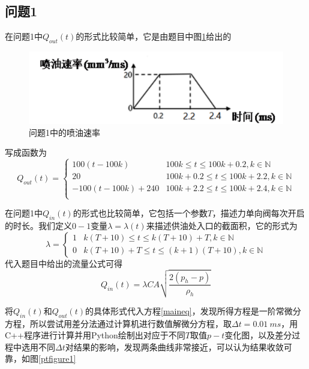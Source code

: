 \documentclass[12pt,AutoFakeBold]{article}%
\begin{document}
    \subsection{问题1}
    在问题1中$Q_{out}(t)$的形式比较简单，它是由题目中图\ref{inputof1}给出的
    \begin{figure}[H]
        \centering
        \includegraphics[scale=0.75]{figure/inputof1.png}
        \caption{问题1中的喷油速率}
        \label{inputof1}
    \end{figure}
    写成函数为
    \begin{equation}
        Q_{out}(t)=
        \begin{cases}
            100(t-100k)&100k\leq t\leq 100k+0.2,k\in\mathbb{N}\\
            20&100k+0.2\leq t\leq 100k+2.2,k\in\mathbb{N}\\
            -100(t-100k)+240&100k+2.2\leq t\leq 100k+2.4,k\in\mathbb{N}\\
        \end{cases}
    \end{equation}\par
    在问题1中$Q_{in}(t)$的形式也比较简单，它包括一个参数$T$，描述力单向阀每次开启的时长。我们定义$0-1$变量$\lambda=\lambda(t)$来描述供油处入口的截面积，它的形式为
    \begin{equation}
        \lambda=
        \begin{cases}
            1 & k(T+10)\leq t\leq k(T+10)+T,k\in\mathbb{N}\\
            0 & k(T+10)+T\leq t\leq (k+1)(T+10),k\in\mathbb{N}
        \end{cases}
    \end{equation}
    代入题目中给出的流量公式可得
    \begin{equation}
        Q_{in}(t)=\lambda CA\sqrt{\frac{2(p_h-p)}{\rho_h}}
    \end{equation}\par
    将$Q_{in}(t)$和$Q_{out}(t)$的具体形式代入方程\ref{maineq}，发现所得方程是一阶常微分方程，所以尝试用差分法通过计算机进行数值解微分方程，取$\Delta t=\SI{0.01}{ms}$，用C++程序进行计算并用Python绘制出对应于不同$T$取值$p-t$变化图，以及差分过程中选用不同$\Delta t$对结果的影响，发现两条曲线非常接近，可以认为结果收敛可靠，如图\ref{ptfigure1}
\end{document}
